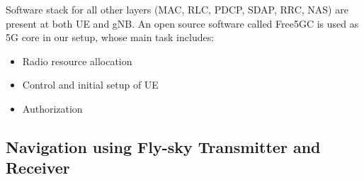 Software stack for all other layers (MAC, RLC, PDCP, SDAP, RRC, NAS) are present at both UE and gNB. An open source software called Free5GC is used as 5G core in our setup, whose main task includes:
\begin{itemize}
	\item Radio resource allocation
	\item Control and initial setup of UE
	\item Authorization 
\end{itemize}

\subsection{Navigation using Fly-sky Transmitter and Receiver} 
